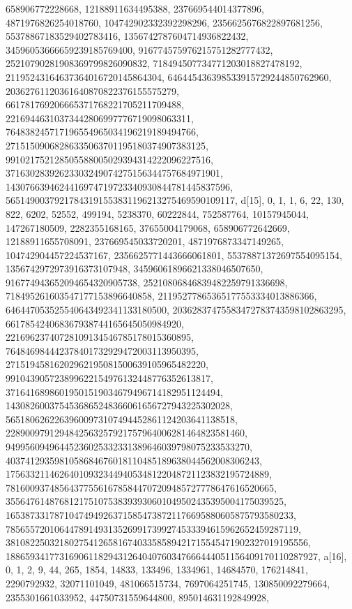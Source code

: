 {{{   658906772228668, 12188911634495388, 237669544014377896, 
   4871976826254018760, 104742902332392298296, 2356625676822897681256, 
   55378867183529402783416, 1356742787604714936822432, 
   34596053666659239185769400, 916774575976215751282777432, 
   25210790281908369799826090832, 718494507734771203018827478192, 
   21195243164637364016720145864304, 646445436398533915729244850762960, 
   20362761120361640870822376155575279, 661781769206665371768221705211709488, 
   22169446310373442806997776719098063311, 
   764838245717196554965034196219189494766, 
   27151509068286335063701195180374907383125, 
   991021752128505588005029394314222096227516, 
   37163028392623303249074275156344757684971901, 
   1430766394624416974719723340930844781445837596, 
   56514900379217843191553831196213275469590109117}}, 
 {d[15], {0, 1, 1, 6, 22, 130, 822, 6202, 52552, 499194, 5238370, 60222844, 
   752587764, 10157945044, 147267180509, 2282355168165, 37655004179068, 
   658906772642669, 12188911655708091, 237669545033720201, 
   4871976873347149265, 104742904457224537167, 2356625771443666061801, 
   55378871372697554095154, 1356742972973916373107948, 
   34596061896621338046507650, 916774943652094654320905738, 
   25210806846839482259791336698, 718495261603547177153896640858, 
   21195277865365177553334013886366, 646447053525540643492341133180500, 
   20362837475583472783743598102863295, 661785424068367938744165645050984920, 
   22169623740728109134546785178015360895, 
   764846984442378401732929472003113950395, 
   27151945816202962195081500639105965482220, 
   991043905723899622154976132448776352613817, 
   37164168986019501519034679496714182951124494, 
   1430826003754536865248366061656727943225302028, 
   56518062622639600973107494452861124203641138518, 
   2289009791294842563257921757964006281464823581460, 
   94995609496445236025332331389646039798075233533270, 
   4037412935981058684676018110485189638044562008306243, 
   175633211462640109323449405348122048721123832195724889, 
   7816009374856437755616785844707209485727778647616520665, 
   355647614876812175107538393930601049502435395004175039525, 
   16538733178710474949263715854738721176695880605875793580233, 
   785655720106447891493135269917399274533394615962652459287119, 
   38108225032180275412658167403358589421715545471902327019195556, 
   1886593417731690611829431264040760347666444051156409170110287927}}, 
 {a[16], {0, 1, 2, 9, 44, 265, 1854, 14833, 133496, 1334961, 14684570, 
   176214841, 2290792932, 32071101049, 481066515734, 7697064251745, 
   130850092279664, 2355301661033952, 44750731559644800, 895014631192849928, 
}}}

